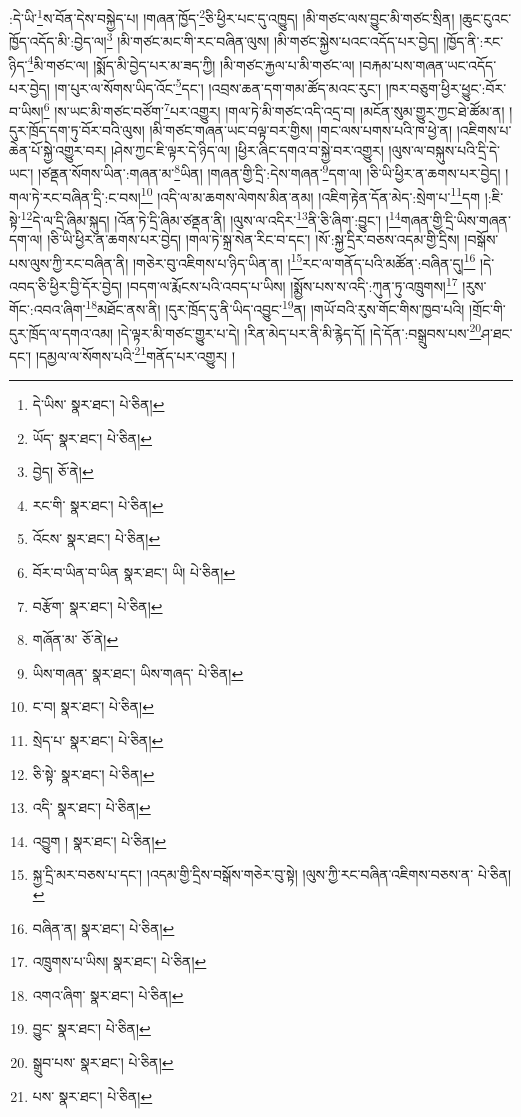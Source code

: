 :དེ་ཡི་\footnote{དེ་ཡིས་  སྣར་ཐང་།  པེ་ཅིན། }ས་བོན་དེས་བསྐྱེད་པ། །གཞན་ཁྱོད་\footnote{ཡོད་  སྣར་ཐང་།  པེ་ཅིན། }ཅི་ཕྱིར་པང་དུ་འཁྱུད། །མི་གཙང་ལས་བྱུང་མི་གཙང་སྲིན། །ཆུང་ངུའང་ཁྱོད་འདོད་མི་:བྱེད་ལ།\footnote{བྱེད།  ཅོ་ནེ། } །མི་གཙང་མང་གི་རང་བཞིན་ལུས། །མི་གཙང་སྐྱེས་པའང་འདོད་པར་བྱེད། །ཁྱོད་ནི་:རང་ཉིད་\footnote{རང་གི་  སྣར་ཐང་།  པེ་ཅིན། }མི་གཙང་ལ། །སྨོད་མི་བྱེད་པར་མ་ཟད་ཀྱི། །མི་གཙང་རྐྱལ་པ་མི་གཙང་ལ། །བརྐམ་པས་གཞན་ཡང་འདོད་པར་བྱེད། །ག་པུར་ལ་སོགས་ཡིད་འོང་\footnote{འོངས་  སྣར་ཐང་།  པེ་ཅིན། }དང་། །འབྲས་ཆན་དག་གམ་ཚོད་མའང་རུང་། །ཁར་བཅུག་ཕྱིར་ཕྱུང་:བོར་བ་ཡིས།\footnote{བོར་བ་ཡིན་བ་ཡིན  སྣར་ཐང་། ཡི།  པེ་ཅིན། } །ས་ཡང་མི་གཙང་བཙོག་\footnote{བརྩོག་  སྣར་ཐང་།  པེ་ཅིན། }པར་འགྱུར། །གལ་ཏེ་མི་གཙང་འདི་འདྲ་བ། །མངོན་སུམ་གྱུར་ཀྱང་ཐེ་ཚོམ་ན། །དུར་ཁྲོད་དག་ཏུ་བོར་བའི་ལུས། །མི་གཙང་གཞན་ཡང་བལྟ་བར་གྱིས། །གང་ལས་པགས་པའི་ཁ་ཕྱེ་ན། །འཇིགས་པ་ཆེན་པོ་སྐྱེ་འགྱུར་བར། །ཤེས་ཀྱང་ཇི་ལྟར་དེ་ཉིད་ལ། །ཕྱིར་ཞིང་དགའ་བ་སྐྱེ་བར་འགྱུར། །ལུས་ལ་བསྐུས་པའི་དྲི་དེ་ཡང་། །ཙནྡན་སོགས་ཡིན་:གཞན་མ་\footnote{གཞོན་མ་  ཅོ་ནེ། }ཡིན། །གཞན་གྱི་དྲི་:དེས་གཞན་\footnote{ཡིས་གཞན་  སྣར་ཐང་། ཡིས་གཞད་  པེ་ཅིན། }དག་ལ། །ཅི་ཡི་ཕྱིར་ན་ཆགས་པར་བྱེད། །གལ་ཏེ་རང་བཞིན་དྲི་:ང་བས།\footnote{ང་བ།  སྣར་ཐང་།  པེ་ཅིན། } །འདི་ལ་མ་ཆགས་ལེགས་མིན་ནམ། །འཇིག་རྟེན་དོན་མེད་:སྲེག་པ་\footnote{སྲེད་པ་  སྣར་ཐང་།  པེ་ཅིན། }དག །:ཇི་སྟེ་\footnote{ཅི་སྟེ་  སྣར་ཐང་།  པེ་ཅིན། }དེ་ལ་དྲི་ཞིམ་སྐུད། །འོན་ཏེ་དྲི་ཞིམ་ཙནྡན་ནི། །ལུས་ལ་འདིར་\footnote{འདི་  སྣར་ཐང་།  པེ་ཅིན། }ནི་ཅི་ཞིག་:བྱུང་། །\footnote{འབྱུག །  སྣར་ཐང་།  པེ་ཅིན། }གཞན་གྱི་དྲི་ཡིས་གཞན་དག་ལ། །ཅི་ཡི་ཕྱིར་ན་ཆགས་པར་བྱེད། །གལ་ཏེ་སྐྲ་སེན་རིང་བ་དང་། །སོ་:སྐྱ་དྲིར་བཅས་འདམ་གྱི་དྲིས། །བསྒོས་པས་ལུས་ཀྱི་རང་བཞིན་ནི། །གཅེར་བུ་འཇིགས་པ་ཉིད་ཡིན་ན། །\footnote{སྐྱ་དྲི་མར་བཅས་པ་དང་། །འདམ་གྱི་དྲིས་བསྒོས་གཅེར་བུ་སྟེ། །ལུས་ཀྱི་རང་བཞིན་འཇིགས་བཅས་ན་  པེ་ཅིན། }རང་ལ་གནོད་པའི་མཚོན་:བཞིན་དུ།\footnote{བཞིན་ན།  སྣར་ཐང་།  པེ་ཅིན། } །དེ་འབད་ཅི་ཕྱིར་བྱི་དོར་བྱེད། །བདག་ལ་རྨོངས་པའི་འབད་པ་ཡིས། །སྨྱོས་པས་ས་འདི་:ཀུན་ཏུ་འཁྲུགས།\footnote{འཁྲུགས་པ་ཡིས།  སྣར་ཐང་།  པེ་ཅིན། } །རུས་གོང་:འབའ་ཞིག་\footnote{འགའ་ཞིག་  སྣར་ཐང་།  པེ་ཅིན། }མཐོང་ནས་ནི། །དུར་ཁྲོད་དུ་ནི་ཡིད་འབྱུང་\footnote{བྱུང་  སྣར་ཐང་།  པེ་ཅིན། }ན། །གཡོ་བའི་རུས་གོང་གིས་ཁྱབ་པའི། །གྲོང་གི་དུར་ཁྲོད་ལ་དགའ་འམ། །དེ་ལྟར་མི་གཙང་གྱུར་པ་དེ། །རིན་མེད་པར་ནི་མི་རྙེད་དོ། །དེ་དོན་:བསྒྲུབས་པས་\footnote{སྒྲུབ་པས་  སྣར་ཐང་།  པེ་ཅིན། }ཤ་ཐང་དང་། །དམྱལ་ལ་སོགས་པའི་\footnote{པས་  སྣར་ཐང་།  པེ་ཅིན། }གནོད་པར་འགྱུར། །
